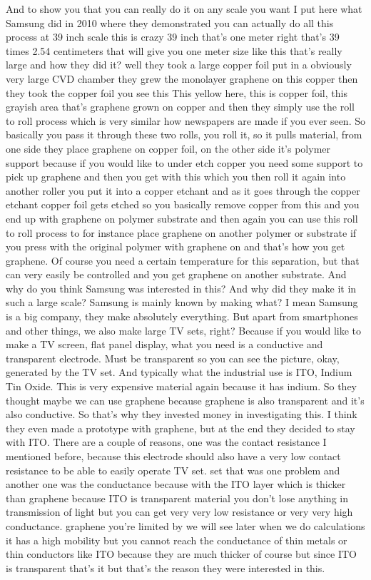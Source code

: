 And to show you that you can really do it on any scale you want I put here what Samsung did in 2010 where they demonstrated you can actually do all this process at 39 inch scale this is crazy 39 inch that's one meter right that's 39 times 2.54 centimeters that will give you one meter size like this that's really large and how they did it? well they took a large copper foil put in a obviously very large CVD chamber they grew the monolayer graphene on this copper then they took the copper foil you see this This yellow here, this is copper foil, this grayish area that's graphene grown on copper and then they simply use the roll to roll process which is very similar how newspapers are made if you ever seen. So basically you pass it through these two rolls, you roll it, so it pulls material, from one side they place graphene on copper foil, on the other side it's polymer support because if you would like to under etch copper you need some support to pick up graphene and then you get with this which you then roll it again into another roller you put it into a copper etchant and as it goes through the copper etchant copper foil gets etched so you basically remove copper from this and you end up with graphene on polymer substrate and then again you can use this roll to roll process to for instance place graphene on another polymer or substrate if you press with the original polymer with graphene on and that's how you get graphene. Of course you need a certain temperature for this separation, but that can very easily be controlled and you get graphene on another substrate. And why do you think Samsung was interested in this? And why did they make it in such a large scale? Samsung is mainly known by making what? I mean Samsung is a big company, they make absolutely everything. But apart from smartphones and other things, we also make large TV sets, right? Because if you would like to make a TV screen, flat panel display, what you need is a conductive and transparent electrode. Must be transparent so you can see the picture, okay, generated by the TV set. And typically what the industrial use is ITO, Indium Tin Oxide. This is very expensive material again because it has indium. So they thought maybe we can use graphene because graphene is also transparent and it's also conductive. So that's why they invested money in investigating this. I think they even made a prototype with graphene, but at the end they decided to stay with ITO. There are a couple of reasons, one was the contact resistance I mentioned before, because this electrode should also have a very low contact resistance to be able to easily operate TV set. set that was one problem and another one was the conductance because with the ITO layer which is thicker than graphene because ITO is transparent material you don't lose anything in transmission of light but you can get very very low resistance or very very high conductance. graphene you're limited by we will see later when we do calculations it has a high mobility but you cannot reach the conductance of thin metals or thin conductors like ITO because they are much thicker of course but since ITO is transparent that's it but that's the reason they were interested in this.
